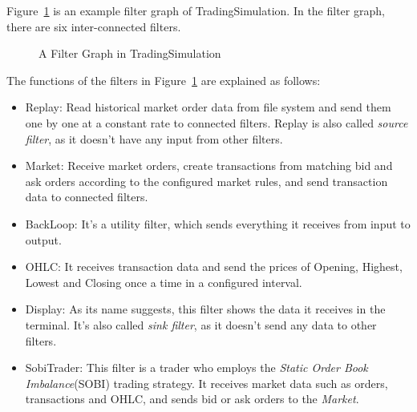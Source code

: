 Figure~\ref{fig-filter-graph} is an example filter graph of TradingSimulation. In the filter graph, there are six inter-connected filters.


\begin{figure}
  \centering
  \centering
  \caption{A Filter Graph in TradingSimulation}
  \label{fig-filter-graph}
\end{figure}

The functions of the filters in Figure~\ref{fig-filter-graph} are explained as follows:

\begin{itemize}
\item{Replay}: Read historical market order data from file system and send them one by one at a constant rate to connected filters. Replay is also called \emph{source filter}, as it doesn't have any input from other filters.
\item{Market}: Receive market orders, create transactions from matching bid and ask orders according to the configured market rules, and send transaction data to connected filters.
\item {BackLoop}: It's a utility filter, which sends everything it receives from input to output.
\item {OHLC}: It receives transaction data and send the prices of Opening, Highest, Lowest and Closing once a time in a configured interval.
\item {Display}: As its name suggests, this filter shows the data it receives in the terminal. It's also called \emph{sink filter}, as it doesn't send any data to other filters.
\item {SobiTrader}: This filter is a trader who employs the \emph{Static Order Book Imbalance}(SOBI) trading strategy. It receives market data such as orders, transactions and OHLC, and sends bid or ask orders to the \emph{Market}.
\end{itemize}

